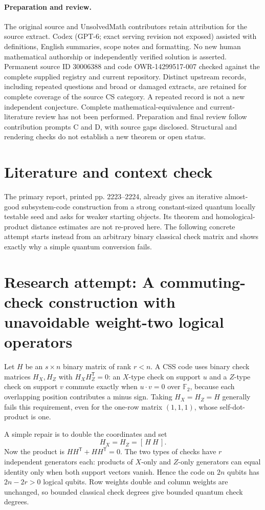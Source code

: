 \documentclass[11pt]{article}
\begin{document}
\paragraph{Preparation and review.}
The original source and UnsolvedMath contributors retain attribution for the source extract. Codex (GPT-6; exact serving revision not exposed) assisted with definitions, English summaries, scope notes and formatting. No new human mathematical authorship or independently verified solution is asserted. Permanent source ID 30006388 and code OWR-14299517-007 checked against the complete supplied registry and current repository. Distinct upstream records, including repeated questions and broad or damaged extracts, are retained for complete coverage of the source CS category. A repeated record is not a new independent conjecture. Complete mathematical-equivalence and current-literature review has not been performed. Preparation and final review follow contribution prompts C and D, with source gaps disclosed. Structural and rendering checks do not establish a new theorem or open status.
\label{end:30006388}

\section{Literature and context check}
The primary report, printed pp. 2223--2224, already gives an iterative almost-good subsystem-code construction from a strong constant-sized quantum locally testable seed and asks for weaker starting objects. Its theorem and homological-product distance estimates are not re-proved here. The following concrete attempt starts instead from an arbitrary binary classical check matrix and shows exactly why a simple quantum conversion fails.
\section{Research attempt: A commuting-check construction with unavoidable weight-two logical operators}

Let $H$ be an $s\times n$ binary matrix of rank $r<n$. A CSS code uses binary check matrices $H_X,H_Z$ with $H_XH_Z^{\mathsf T}=0$: an $X$-type check on support $u$ and a $Z$-type check on support $v$ commute exactly when $u\cdot v=0$ over $\mathbb F_2$, because each overlapping position contributes a minus sign. Taking $H_X=H_Z=H$ generally fails this requirement, even for the one-row matrix $(1,1,1)$, whose self-dot-product is one.

A simple repair is to double the coordinates and set
\[
H_X=H_Z=[\,H\ H\,].
\]
Now the product is $HH^{\mathsf T}+HH^{\mathsf T}=0$. The two types of checks have $r$ independent generators each: products of $X$-only and $Z$-only generators can equal identity only when both support vectors vanish. Hence the code on $2n$ qubits has $2n-2r>0$ logical qubits. Row weights double and column weights are unchanged, so bounded classical check degrees give bounded quantum check degrees.
\end{document}
